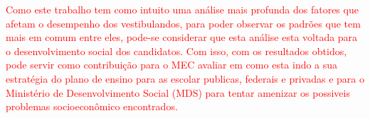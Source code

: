 \par 
\textcolor{red}{Como este trabalho tem como intuito uma análise mais profunda dos fatores que afetam o desempenho dos vestibulandos, para poder observar os padrões que tem mais em comum entre eles, pode-se considerar que esta análise esta voltada para o desenvolvimento social dos candidatos. Com isso, com os resultados obtidos, pode servir como contribuição para o MEC avaliar em como esta indo a sua estratégia do plano de ensino para as escolar publicas, federais e privadas e para o Ministério de Desenvolvimento Social (MDS) para tentar amenizar os possiveis problemas socioeconômico encontrados.}


